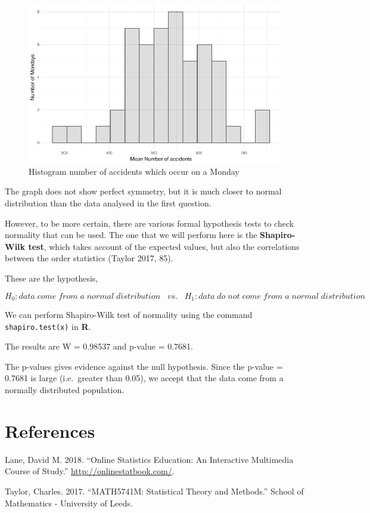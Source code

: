 \documentclass[]{article}
\begin{document}
\begin{figure}[H]

{\centering \includegraphics{READMEv5_files/figure-latex/fig4-1} 

}

\caption{Histogram number of accidents which occur on a Monday}\label{fig:fig4}
\end{figure}

The graph does not show perfect symmetry, but it is much closer to
normal distribution than the data analysed in the first question.

However, to be more certain, there are various formal hypothesis tests
to check normality that can be used. The one that we will perform here
is the \textbf{Shapiro-Wilk test}, which takes account of the expected
values, but also the correlations between the order statistics (Taylor
2017, 85).

These are the hypothesis,

\[H_{0}: data\;come\;from\;a\;normal\;distribution\;\;\;vs.\;\;\;H_{1}:data\;do\;not\;come\;from\;a\;normal\;distribution\]

We can perform Shapiro-Wilk test of normality using the command
\texttt{shapiro.test(x)} in \textbf{R}.

The results are W = 0.98537 and p-value = 0.7681.

The p-values gives evidence against the null hypothesis. Since the
p-value = 0.7681 is large (i.e.~greater than 0.05), we accept that the
data come from a normally distributed population.

\section*{References}\label{references}

\hypertarget{refs}{}
\hypertarget{ref-lane_online_2018}{}
Lane, David M. 2018. ``Online Statistics Education: An Interactive
Multimedia Course of Study.'' \url{http://onlinestatbook.com/}.

\hypertarget{ref-taylor_math5741m:_2017}{}
Taylor, Charles. 2017. ``MATH5741M: Statistical Theory and Methods.''
School of Mathematics - University of Leeds.
\end{document}
